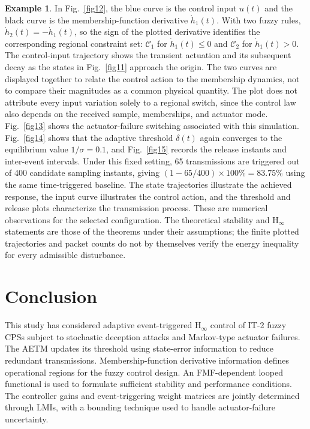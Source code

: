 \documentclass[preprint,review,fleqn,sort&compress,3p]{elsarticle}
\theoremstyle{definition} %
\theoremstyle{definition}%
\newtheorem{example}{Example}
\begin{document}
\begin{example}
In Fig.~\ref{fig12}, the blue curve is the control input $u(t)$ and the black curve is the membership-function derivative $\dot h_1(t)$. With two fuzzy rules, $\dot h_2(t)=-\dot h_1(t)$, so the sign of the plotted derivative identifies the corresponding regional constraint set: $\mathcal C_1$ for $\dot h_1(t)\leq0$ and $\mathcal C_2$ for $\dot h_1(t)>0$. The control-input trajectory shows the transient actuation and its subsequent decay as the states in Fig.~\ref{fig11} approach the origin. The two curves are displayed together to relate the control action to the membership dynamics, not to compare their magnitudes as a common physical quantity. The plot does not attribute every input variation solely to a regional switch, since the control law also depends on the received sample, memberships, and actuator mode. Fig.~\ref{fig13} shows the actuator-failure switching associated with this simulation.
Fig.~\ref{fig14} shows that the adaptive threshold $\delta(t)$ again converges to the equilibrium value $1/\sigma = 0.1$, and Fig.~\ref{fig15} records the release instants and inter-event intervals. Under this fixed setting, 65 transmissions are triggered out of 400 candidate sampling instants, giving $(1-65/400)\times100\%=83.75\%$ using the same time-triggered baseline. The state trajectories illustrate the achieved response, the input curve illustrates the control action, and the threshold and release plots characterize the transmission process. These are numerical observations for the selected configuration. The theoretical stability and $\mathrm H_\infty$ statements are those of the theorems under their assumptions; the finite plotted trajectories and packet counts do not by themselves verify the energy inequality for every admissible disturbance.

\end{example}

\section{Conclusion} \label{sec5}
This study has considered adaptive event-triggered $\mathrm{H}_{\infty}$ control of IT-2 fuzzy CPSs subject to stochastic deception attacks and Markov-type actuator failures. The AETM updates its threshold using state-error information to reduce redundant transmissions. Membership-function derivative information defines operational regions for the fuzzy control design. An FMF-dependent looped functional is used to formulate sufficient stability and performance conditions. The controller gains and event-triggering weight matrices are jointly determined through LMIs, with a bounding technique used to handle actuator-failure uncertainty.
\end{document}
